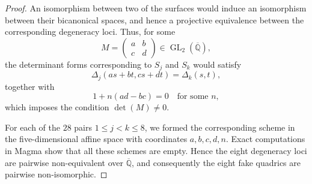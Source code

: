 \documentclass[10pt,a4paper]{amsart}
\begin{document}
\begin{proof}
An isomorphism between two of the surfaces would induce an isomorphism
between their bicanonical spaces, and hence a projective equivalence
between the corresponding degeneracy loci. Thus, for some
\[
        M=
        \begin{pmatrix}
        a&b\\ c&d
        \end{pmatrix}
        \in\operatorname{GL}_2(\overline{\mathbb Q}),
\]
the determinant forms corresponding to \(S_j\) and \(S_k\) would
satisfy
\[
        \Delta_j(as+bt,cs+dt)=\Delta_k(s,t),
\]
together with
\[
        1+n(ad-bc)=0
        \quad\text{for some }n,
\]
which imposes the condition \(\det(M)\neq0\).

For each of the \(28\) pairs \(1\leq j<k\leq8\), we formed the
corresponding scheme in the five-dimensional affine space with
coordinates \(a,b,c,d,n\). Exact computations in Magma show that all
these schemes are empty. Hence the eight degeneracy loci are pairwise
non-equivalent over \(\overline{\mathbb Q}\), and consequently the eight
fake quadrics are pairwise non-isomorphic.
\end{proof}
\end{document}
